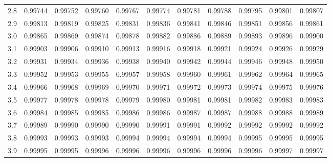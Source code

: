 \documentclass{article}
\begin{document}
\begin{center}
\begin{tabularx}{\linewidth}{*{11}{Y}}
2.8 & 0.99744 & 0.99752 & 0.99760 & 0.99767 & 0.99774 & 0.99781 & 0.99788 & 0.99795 & 0.99801 & 0.99807\\
2.9 & 0.99813 & 0.99819 & 0.99825 & 0.99831 & 0.99836 & 0.99841 & 0.99846 & 0.99851 & 0.99856 & 0.99861\\
3.0 & 0.99865 & 0.99869 & 0.99874 & 0.99878 & 0.99882 & 0.99886 & 0.99889 & 0.99893 & 0.99896 & 0.99900\\
3.1 & 0.99903 & 0.99906 & 0.99910 & 0.99913 & 0.99916 & 0.99918 & 0.99921 & 0.99924 & 0.99926 & 0.99929\\
3.2 & 0.99931 & 0.99934 & 0.99936 & 0.99938 & 0.99940 & 0.99942 & 0.99944 & 0.99946 & 0.99948 & 0.99950\\
3.3 & 0.99952 & 0.99953 & 0.99955 & 0.99957 & 0.99958 & 0.99960 & 0.99961 & 0.99962 & 0.99964 & 0.99965\\
3.4 & 0.99966 & 0.99968 & 0.99969 & 0.99970 & 0.99971 & 0.99972 & 0.99973 & 0.99974 & 0.99975 & 0.99976\\
3.5 & 0.99977 & 0.99978 & 0.99978 & 0.99979 & 0.99980 & 0.99981 & 0.99981 & 0.99982 & 0.99983 & 0.99983\\
3.6 & 0.99984 & 0.99985 & 0.99985 & 0.99986 & 0.99986 & 0.99987 & 0.99987 & 0.99988 & 0.99988 & 0.99989\\
3.7 & 0.99989 & 0.99990 & 0.99990 & 0.99990 & 0.99991 & 0.99991 & 0.99992 & 0.99992 & 0.99992 & 0.99992\\
3.8 & 0.99993 & 0.99993 & 0.99993 & 0.99994 & 0.99994 & 0.99994 & 0.99994 & 0.99995 & 0.99995 & 0.99995\\
3.9 & 0.99995 & 0.99995 & 0.99996 & 0.99996 & 0.99996 & 0.99996 & 0.99996 & 0.99996 & 0.99997 & 0.99997\\
\bottomrule
    \end{tabularx}
  \end{center}
\end{document}
